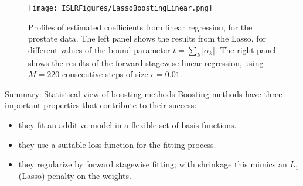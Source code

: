 \documentclass{beamer}
\begin{document}
                            \begin{frame}{}
                                        \begin{figure}
                          \centering
                          
                          \centering
                          \texttt{[image: ISLRFigures/LassoBoostingLinear.png]}
                          \caption{Profiles of estimated coefficients from linear regression, for the
prostate data. The left panel shows the results from the Lasso,
for different values of the bound parameter $t = \sum_k|\alpha_k|$. The right panel shows
the results of the forward stagewise linear regression, using $M = 220$ consecutive steps of size $\epsilon=0.01$.
                          }
                        \end{figure}
                            \end{frame}

              \begin{frame}{Summary: Statistical view of boosting methods}
                    Boosting methods have three important properties that contribute to their success:
                     \begin{itemize}
                      \item they fit an additive model in a flexible set of basis functions.

                      \item they use a suitable loss function for the fitting process.

                      \item they regularize by forward stagewise fitting; with shrinkage this mimics an $L_1$ (Lasso) penalty on the weights.
                     \end{itemize}
                     \end{frame}
                      
      			
      			
      				
      			
   
      		
      				
      				
      				
      				
      				
      
    
\end{document}
